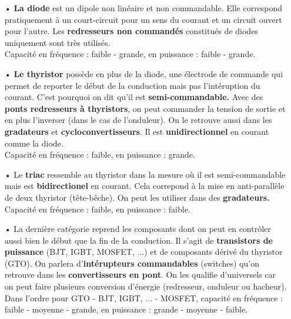 		\begin{itemize}
			\item[•] \textbf{La diode} est un dipole non linéaire et non commandable. Elle correspond pratiquement à un court-circuit pour un sens du courant et un circuit ouvert pour l'autre. Les \textbf{redresseurs non commandés} constitués de diodes uniquement sont très utilisés. \\
			Capacité en fréquence : faible - grande, en puissance : faible - grande.\\
			
			\item[•] \textbf{Le thyristor} possède en plus de la diode, une électrode de commande qui permet de reporter le début de la conduction mais pas l'intéruption du courant. C'est pourquoi on dit qu'il est \textbf{semi-commandable.}  Avec des \textbf{ponts redresseurs à thyristors}, on peut commander la tension de sortie et en plus l'inverser (dans le cas de l'onduleur). On le retrouve aussi dans les \textbf{gradateurs} et \textbf{cycloconvertisseurs}. Il est \textbf{unidirectionnel} en courant comme la diode. \\
			Capacité en fréquence : faible, en puissance : grande.\\
			
			\item[•] Le \textbf{triac} ressemble au thyristor dans la mesure où il est semi-commandable mais est \textbf{bidirectionel} en courant. Cela correpond à la mise en anti-parallèle de deux thyristor (tête-bêche). On peut les utiliser dans des \textbf{gradateurs.}\\
			Capacité en fréquence : faible, en puissance : faible.\\
			
			\item[•] La dernière catégorie reprend les composants dont on peut en contrôler aussi bien le début que la fin de la conduction. Il s'agit de \textbf{transistors de puissance} (BJT, IGBT, MOSFET, ...) et de composants dérivé du thyristor (GTO). On parlera d'\textbf{intérupteurs commandables} (switches) qu'on retrouve dans les \textbf{convertisseurs en pont}. On les qualifie d'universels car on peut faire plusieurs conversion d'énergie (redresseur, onduleur ou hacheur). \\
			Dans l'ordre pour GTO - BJT, IGBT, ... - MOSFET, capacité en fréquence : faible - moyenne - grande, en puissance : grande - moyenne - faible. 
		\end{itemize}
		
